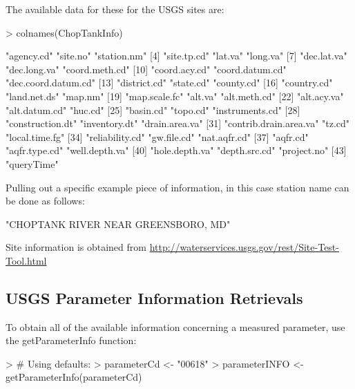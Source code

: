 \documentclass[a4paper,11pt]{article}
\begin{document}
The available data for these for the USGS sites are:
\begin{Schunk}
\begin{Sinput}
> colnames(ChopTankInfo)
\end{Sinput}
\begin{Soutput}
 [1] "agency.cd"             "site.no"               "station.nm"           
 [4] "site.tp.cd"            "lat.va"                "long.va"              
 [7] "dec.lat.va"            "dec.long.va"           "coord.meth.cd"        
[10] "coord.acy.cd"          "coord.datum.cd"        "dec.coord.datum.cd"   
[13] "district.cd"           "state.cd"              "county.cd"            
[16] "country.cd"            "land.net.ds"           "map.nm"               
[19] "map.scale.fc"          "alt.va"                "alt.meth.cd"          
[22] "alt.acy.va"            "alt.datum.cd"          "huc.cd"               
[25] "basin.cd"              "topo.cd"               "instruments.cd"       
[28] "construction.dt"       "inventory.dt"          "drain.area.va"        
[31] "contrib.drain.area.va" "tz.cd"                 "local.time.fg"        
[34] "reliability.cd"        "gw.file.cd"            "nat.aqfr.cd"          
[37] "aqfr.cd"               "aqfr.type.cd"          "well.depth.va"        
[40] "hole.depth.va"         "depth.src.cd"          "project.no"           
[43] "queryTime"            
\end{Soutput}
\end{Schunk}
Pulling out a specific example piece of information, in this case station name can be done as follows:
\begin{Schunk}
\begin{Soutput}
[1] "CHOPTANK RIVER NEAR GREENSBORO, MD"
\end{Soutput}
\end{Schunk}
Site information is obtained from \url{http://waterservices.usgs.gov/rest/Site-Test-Tool.html}

\subsection{USGS Parameter Information Retrievals}
To obtain all of the available information concerning a measured parameter, use the getParameterInfo function:
\begin{Schunk}
\begin{Sinput}
> # Using defaults:
> parameterCd <- "00618" 
> parameterINFO <- getParameterInfo(parameterCd)
\end{Sinput}
\end{Schunk}
\end{document}
